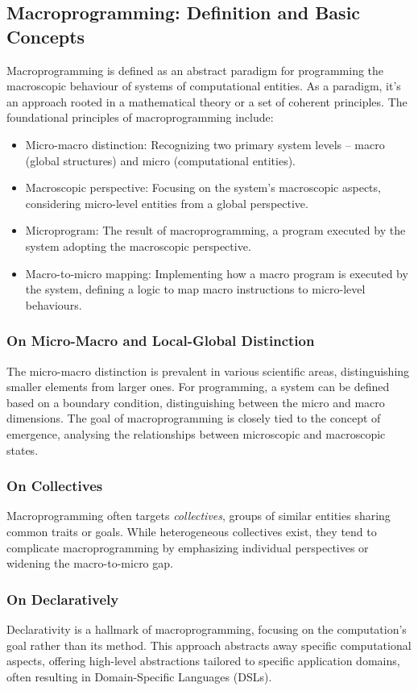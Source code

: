 \subsection{Macroprogramming: Definition and Basic Concepts}
\sloppy
Macroprogramming is defined as an abstract paradigm for programming the macroscopic behaviour of systems of computational entities. 
 As a paradigm, it's an approach rooted in a mathematical theory or a set of coherent principles. 
 The foundational principles of macroprogramming include:
\begin{itemize}
    \item Micro-macro distinction: Recognizing two primary system levels -- macro (global structures) and micro (computational entities).
    \item Macroscopic perspective: Focusing on the system's macroscopic aspects, 
    considering micro-level entities from a global perspective.
    \item Microprogram: The result of macroprogramming, a program executed by the system adopting the macroscopic perspective.
    \item Macro-to-micro mapping: Implementing how a macro program is executed by the system, 
    defining a logic to map macro instructions to micro-level behaviours.
\end{itemize}

\subsubsection{On Micro-Macro and Local-Global Distinction}
The micro-macro distinction is prevalent in various scientific areas, 
 distinguishing smaller elements from larger ones. 
 For programming, a system can be defined based on a boundary condition, 
 distinguishing between the micro and macro dimensions. 
 The goal of macroprogramming is closely tied to the concept of emergence, 
 analysing the relationships between microscopic and macroscopic states.


\subsubsection{On Collectives}
Macroprogramming often targets \emph{collectives}, 
 groups of similar entities sharing common traits or goals. 
% 
While heterogeneous collectives exist, 
 they tend to complicate macroprogramming by emphasizing individual perspectives or widening the macro-to-micro gap.

\subsubsection{On Declaratively}
Declarativity is a hallmark of macroprogramming, 
 focusing on the computation's goal rather than its method. 
 This approach abstracts away specific computational aspects, 
 offering high-level abstractions tailored to specific application domains, 
 often resulting in Domain-Specific Languages (DSLs).

